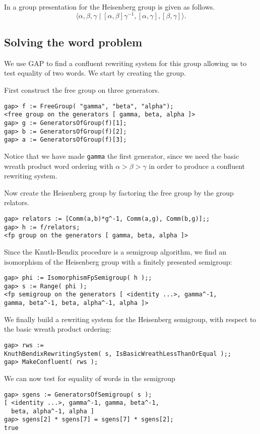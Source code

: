 \documentclass[12pt]{article}
\theoremstyle{plain} \newtheorem{Thm}{Theorem}
\theoremstyle{plain} \newtheorem{Cor}{Corollary}
\theoremstyle{plain} \newtheorem{Lemma}{Lemma}
\theoremstyle{plain} \newtheorem{Prop}{Proposition}
\theoremstyle{plain} \newtheorem{Ex}{Exercise}
\def\gap{\sf GAP}
\begin{document}
In \cite{eps} a group presentation for 
the Heisenberg group is given as follows. 
$$\langle \alpha ,\beta ,\gamma \mid 
[ \alpha ,\beta ] \gamma ^{-1} ,
[ \alpha ,\gamma ] , [ \beta ,\gamma ] \rangle .$$  

\subsection{Solving the word problem}
We use {\gap} to find a confluent rewriting system for 
this group allowing us to test equality of two words.
We start by creating the group. 

First construct the free group on three generators.
\begin{verbatim}
gap> f := FreeGroup( "gamma", "beta", "alpha");
<free group on the generators [ gamma, beta, alpha ]>
gap> g := GeneratorsOfGroup(f)[1];
gap> b := GeneratorsOfGroup(f)[2];
gap> a := GeneratorsOfGroup(f)[3];
\end{verbatim}
Notice that we have made {\tt gamma}  the first 
generator, since we need the basic wreath product 
word ordering with  $\alpha > \beta > \gamma$ 
in order to produce a confluent rewriting system.

Now create the Heisenberg group by factoring the free group 
by the group relators.
\begin{verbatim}
gap> relators := [Comm(a,b)*g^-1, Comm(a,g), Comm(b,g)];;
gap> h := f/relators;
<fp group on the generators [ gamma, beta, alpha ]>
\end{verbatim}

Since the Knuth-Bendix procedure is a semigroup algorithm, 
we find an isomorphism of the Heisenberg group with 
a finitely presented semigroup:
\begin{verbatim}
gap> phi := IsomorphismFpSemigroup( h );;
gap> s := Range( phi );
<fp semigroup on the generators [ <identity ...>, gamma^-1, 
gamma, beta^-1, beta, alpha^-1, alpha ]>
\end{verbatim}

We finally build a rewriting system for the Heisenberg semigroup,
with respect to the basic wreath product ordering:
\begin{verbatim}
gap> rws := 
KnuthBendixRewritingSystem( s, IsBasicWreathLessThanOrEqual );;
gap> MakeConfluent( rws );
\end{verbatim}

We can now test for equality of words in the semigroup
\begin{verbatim}
gap> sgens := GeneratorsOfSemigroup( s );
[ <identity ...>, gamma^-1, gamma, beta^-1, 
  beta, alpha^-1, alpha ]
gap> sgens[2] * sgens[7] = sgens[7] * sgens[2];
true
\end{verbatim}
\end{document}

